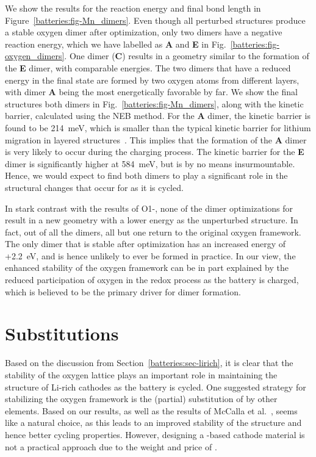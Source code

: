 \begin{refsection}
We show the results for the reaction energy and final bond length in Figure~\ref{batteries:fig-Mn_dimers}. Even though all perturbed structures produce a stable oxygen dimer after optimization, only two dimers have a negative reaction energy, which we have labelled as \textbf{A} and \textbf{E} in Fig.~\ref{batteries:fig-oxygen_dimers}. One dimer (\textbf{C}) results in a geometry similar to the formation of the \textbf{E} dimer, with comparable energies. The two dimers that have a reduced energy in the final state are formed by two oxygen atoms from different layers, with dimer \textbf{A} being the most energetically favorable by far. We show the final structures both dimers in Fig.~\ref{batteries:fig-Mn_dimers}, along with the kinetic barrier, calculated using the NEB method. For the \textbf{A} dimer, the kinetic barrier is found to be 214~\si{\milli\electronvolt}, which is smaller than the typical kinetic barrier for lithium migration in layered structures~\cite{VanDerVen2013}. This implies that the formation of the \textbf{A} dimer is very likely to occur during the charging process. The kinetic barrier for the \textbf{E} dimer is significantly higher at 584~\si{\milli\electronvolt}, but is by no means insurmountable. Hence, we would expect to find both dimers to play a significant role in the structural changes that occur for  as it is cycled.

In stark contrast with the results of O1-, none of the dimer optimizations for  result in a new geometry with a lower energy as the unperturbed structure. In fact, out of all the dimers, all but one return to the original oxygen framework. The only dimer that is stable after optimization has an increased energy of +2.2~\si{\electronvolt}, and is hence unlikely to ever be formed in practice. In our view, the enhanced stability of the oxygen framework can be in part explained by the reduced participation of oxygen in the redox process as the battery is charged, which is believed to be the primary driver for dimer formation.

\section{Substitutions} \label{batteries:sec-substitutions}

Based on the discussion from Section~\ref{batteries:sec-lirich}, it is clear that the stability of the oxygen lattice plays an important role in maintaining the structure of Li-rich cathodes as the battery is cycled. One suggested strategy for stabilizing the oxygen framework is the (partial) substitution of  by other elements. Based on our results, as well as the results of McCalla et al.~\cite{McCalla2015},  seems like a natural choice, as this leads to an improved stability of the structure and hence better cycling properties. However, designing a -based cathode material is not a practical approach due to the weight and price of .


\end{refsection}
